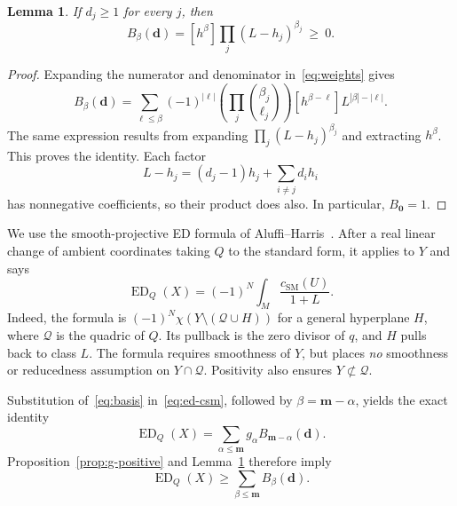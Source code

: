 \documentclass[11pt]{article}
\newtheorem{lemma}[theorem]{Lemma}
\theoremstyle{remark}\newtheorem{remark}[theorem]{Remark}
\newcommand{\ED}{\operatorname{ED}}
\newcommand{\csm}{c_{\mathrm{SM}}}
\begin{document}
\begin{lemma}\label{lem:weights}
If $d_j\geq1$ for every $j$, then
\begin{equation}\label{eq:positive-weight}
 B_\beta(\mathbf d)
 =[h^\beta]\prod_j(L-h_j)^{\beta_j}\ \geq\ 0.
\end{equation}
\end{lemma}
\begin{proof}
Expanding the numerator and denominator in~\eqref{eq:weights} gives
\[
 B_\beta(\mathbf d)=
 \sum_{\ell\leq\beta}(-1)^{|\ell|}
 \left(\prod_j\binom{\beta_j}{\ell_j}\right)
 [h^{\beta-\ell}]L^{|\beta|-|\ell|}.
\]
The same expression results from expanding $\prod_j(L-h_j)^{\beta_j}$ and extracting $h^\beta$. This proves the identity. Each factor
\[
 L-h_j=(d_j-1)h_j+\sum_{i\neq j}d_ih_i
\]
has nonnegative coefficients, so their product does also. In particular, $B_{\mathbf0}=1$.
\end{proof}

We use the smooth-projective ED formula of Aluffi--Harris~\cite[Theorem 8.1 and (7.3)]{AH}. After a real linear change of ambient coordinates taking $Q$ to the standard form, it applies to $Y$ and says
\begin{equation}\label{eq:ed-csm}
 \ED_Q(X)=(-1)^N\int_M\frac{\csm(U)}{1+L}.
\end{equation}
Indeed, the formula is $(-1)^N\chi(Y\setminus(\mathcal Q\cup H))$ for a general hyperplane $H$, where $\mathcal Q$ is the quadric of $Q$. Its pullback is the zero divisor of $q$, and $H$ pulls back to class $L$. The formula requires smoothness of $Y$, but places \emph{no} smoothness or reducedness assumption on $Y\cap\mathcal Q$. Positivity also ensures $Y\not\subset\mathcal Q$.

Substitution of~\eqref{eq:basis} in~\eqref{eq:ed-csm}, followed by $\beta=\mathbf m-\alpha$, yields the exact identity
\begin{equation}\label{eq:ed-sum}
 \ED_Q(X)=\sum_{\alpha\leq\mathbf m}
 g_\alpha B_{\mathbf m-\alpha}(\mathbf d).
\end{equation}
Proposition~\ref{prop:g-positive} and Lemma~\ref{lem:weights} therefore imply
\begin{equation}\label{eq:lower}
 \ED_Q(X)\geq\sum_{\beta\leq\mathbf m}B_\beta(\mathbf d).
\end{equation}
\end{document}
